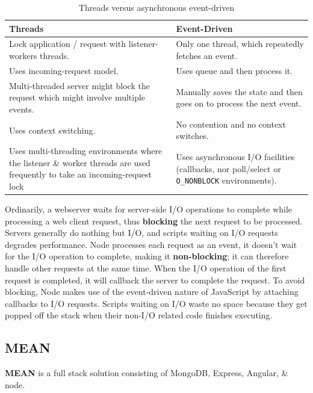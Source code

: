 \documentclass[a4paper,11pt]{article}
\begin{document}
\begin{table}[H]
    \centering
    \begin{tabular}{|p{}|p{}|}
            \hline
            \textbf{Threads} & \textbf{Event-Driven} \\
            \hline
            Lock application / request with listener-workers threads. & Only one thread, which repeatedly fetches an event. \\
            \hline
            Uses incoming-request model. & Uses queue and then process it. \\
            \hline
            Multi-threaded server might block the request which might involve multiple events. & Manually saves the state and then goes on to process the next event. \\
            \hline
            Uses context switching. & No contention and no context switches.\\
            \hline
            Uses multi-threading environments where the listener \& worker threads are used frequently to take an incoming-request lock & Uses asynchronous I/O facilities (callbacks, nor poll/select or \verb|O_NONBLOCK| environments).\\
            \hline
        \end{tabular}
    \caption{Threads versus asynchronous event-driven}
\end{table}

Ordinarily, a webserver waits for server-side I/O operations to complete while processing a web client request, thus \textbf{blocking} the next request to be processed.
Servers generally do nothing but I/O, and scripts waiting on I/O requests degrades performance.
Node processes each request as an event, it doesn't wait for the I/O operation to complete, making it \textbf{non-blocking}; it can therefore handle other requests at the same time.
When the I/O operation of the first request is completed, it will callback the server to complete the request.
To avoid blocking, Node makes use of the event-driven nature of JavaScript by attaching callbacks to I/O requests.
Scripts waiting on I/O waste no space because they get popped off the stack when their non-I/O related code finishes executing.

\subsection{MEAN}
\textbf{MEAN} is a full stack solution consisting of MongoDB, Express, Angular, \& node.
\end{document}
